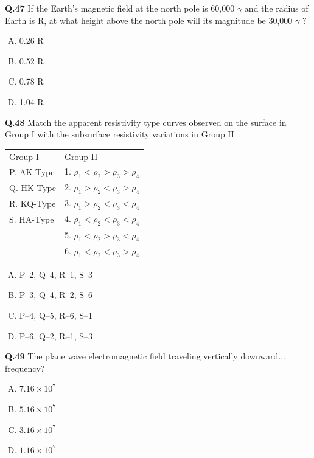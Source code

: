 \textbf{Q.47} If the Earth's magnetic field at the north pole is 60,000 $\gamma$ and the radius of Earth is R, at what height above the north pole will its magnitude be 30,000 $\gamma$ ?
\begin{multicols}{4}
    

\begin{enumerate}[(A)]
    \item 0.26 R
    \item 0.52 R
    \item 0.78 R
    \item 1.04 R
\end{enumerate}
\end{multicols}
\textbf{Q.48} Match the apparent resistivity type curves observed on the surface in Group I with the subsurface resistivity variations in Group II  

\begin{center}
\begin{tabular}{ll}
Group I & Group II \\
P. AK-Type & 1. $\rho_1 < \rho_2 > \rho_3 > \rho_4$ \\
Q. HK-Type & 2. $\rho_1 > \rho_2 < \rho_3 > \rho_4$ \\
R. KQ-Type & 3. $\rho_1 > \rho_2 < \rho_3 < \rho_4$ \\
S. HA-Type & 4. $\rho_1 < \rho_2 < \rho_3 < \rho_4$ \\
 & 5. $\rho_1 < \rho_2 > \rho_3 < \rho_4$ \\
 & 6. $\rho_1 < \rho_2 < \rho_3 > \rho_4$ \\
\end{tabular}
\end{center}

\begin{enumerate}[(A)]
    \item P--2, Q--4, R--1, S--3
    \item P--3, Q--4, R--2, S--6
    \item P--4, Q--5, R--6, S--1
    \item P--6, Q--2, R--1, S--3
\end{enumerate}

\textbf{Q.49} The plane wave electromagnetic field traveling vertically downward... frequency?
\begin{enumerate}[(A)]
    \item $7.16 \times 10^7$
    \item $5.16 \times 10^7$
    \item $3.16 \times 10^7$
    \item $1.16 \times 10^7$
\end{enumerate}

